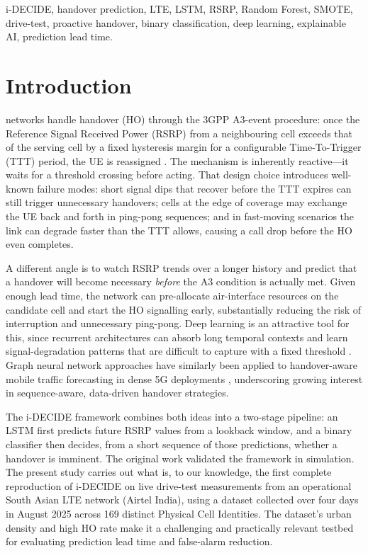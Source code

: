 \documentclass[journal]{IEEEtran}
\begin{document}
\begin{IEEEkeywords}
i-DECIDE, handover prediction, LTE, LSTM, RSRP, Random Forest, SMOTE,
drive-test, proactive handover, binary classification, deep learning,
explainable AI, prediction lead time.
\end{IEEEkeywords}

\section{Introduction}
\label{sec:intro}

 networks handle handover (HO) through the
3GPP A3-event procedure: once the Reference Signal Received Power (RSRP)
from a neighbouring cell exceeds that of the serving cell by a fixed
hysteresis margin for a configurable Time-To-Trigger (TTT) period, the
UE is reassigned \cite{3gpp_36331}. The mechanism is inherently
reactive---it waits for a threshold crossing before acting. That design
choice introduces well-known failure modes: short signal dips that recover
before the TTT expires can still trigger unnecessary handovers; cells at
the edge of coverage may exchange the UE back and forth in ping-pong
sequences; and in fast-moving scenarios the link can degrade faster than
the TTT allows, causing a call drop before the HO even completes.

A different angle is to watch RSRP trends over a longer history and
predict that a handover will become necessary \emph{before} the A3
condition is actually met. Given enough lead time, the network can
pre-allocate air-interface resources on the candidate cell and start
the HO signalling early, substantially reducing the risk of interruption
and unnecessary ping-pong. Deep learning is an attractive tool for this,
since recurrent architectures can absorb long temporal contexts and learn
signal-degradation patterns that are difficult to capture with a fixed
threshold \cite{lima2023icc}. Graph neural network approaches have similarly
been applied to handover-aware mobile traffic forecasting in dense 5G
deployments \cite{fang2022sdgnet}, underscoring growing interest in
sequence-aware, data-driven handover strategies.

The i-DECIDE framework \cite{lima2023idecide} combines both ideas into
a two-stage pipeline: an LSTM first predicts future RSRP values from
a lookback window, and a binary classifier then decides, from a short
sequence of those predictions, whether a handover is imminent. The
original work validated the framework in simulation. The present study
carries out what is, to our knowledge, the first complete reproduction
of i-DECIDE on live drive-test measurements from an operational South
Asian LTE network (Airtel India), using a dataset collected over four
days in August 2025 across 169 distinct Physical Cell Identities. The
dataset's urban density and high HO rate make it a challenging and
practically relevant testbed for evaluating prediction lead time and
false-alarm reduction.
\end{document}
